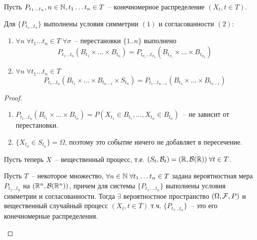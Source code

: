 Пусть $P_{t_1 \dots t_n}, n \in \mathbb{N}, t_1 \dots t_n \in T$~-- конечномерное распределение $(X_t, t \in T)$.

\begin{lem}
Для $\{P_{t_1 \dots t_n}\}$ выполнены условия симметрии $(1)$ и согласованности $(2)$:
\begin{enumerate}
\item $\forall n \; \forall t_1 \dots t_n \in T \; \forall \sigma$~-- перестановки $\{1 .. n\}$ выполнено
$$P_{t_1 \dots t_n}(B_{t_1} \times \dots \times B_{t_n}) =
P_{t_{\sigma_1} \dots t_{\sigma_n}} (B_{t_{\sigma_1}} \times \dots \times B_{t_{\sigma_n}})
$$

\item $\forall n \; \forall t_1 \dots t_n \in T$
$$P_{t_1 \dots t_n}(B_{t_1} \times \dots \times B_{t_{n-1}} \times S_{t_n}) =
P_{t_1 \dots t_{n-1}}(B_{t_1} \times \dots \times B_{t_{n-1}})$$
\end{enumerate}

\begin{proof} \forcenewline
\begin{enumerate}
\item $P_{t_1 \dots t_n}(B_{t_1} \times \dots \times B_{t_n})
= P(X_{t_1} \in B_{t_1}, \dots, X_{t_n} \in B_{t_n})$~-- не зависит от перестановки.
\item $\{X_{t_n} \in S_{t_n}\} =  \Omega$, поэтому это событие ничего не добавляет в пересечение.
\end{enumerate}

Пусть теперь $X$~--  вещественный процесс, т.е. $(S_t, \mathcal{B}_t) = (\mathbb{R}, \mathcal{B}(\mathbb{R})) \; \forall t \in T$.
\begin{theorem}
Пусть $T$~-- некоторое множество, $\forall n \in \mathbb{N} \; \forall t_1 \dots t_n \in T$ задана
вероятностная мера
$P_{t_1 \dots t_n}$ на $(\mathbb{R}^n, \mathcal{B}(\mathbb{R}^n))$,
причем для системы $\{P_{t_1, \dots t_n}\}$  выполнены условия симметрии и согласованности.
Тогда $\exists$ вероятностное пространство $(\Omega, \mathcal{F}, P)$
и вещественный случайный процесс $(X_t, t \in T)$
т.ч. $\{P_{t_1 \dots t_n}\}$~-- это его конечномерные распределения.
\end{theorem}
\end{proof}
\end{lem}

